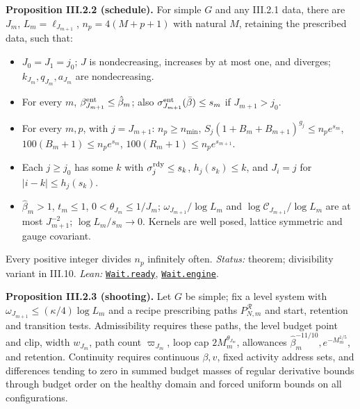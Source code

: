\documentclass[
  letterpaper,
  11pt]{article}
\providecommand{\tightlist}{%
  \setlength{\itemsep}{0pt}\setlength{\parskip}{0pt}}
\begin{document}
\textbf{Proposition III.2.2 (schedule).} For simple \(G\) and any
III.2.1 data, there are \(J_m\), \(L_m=\ell_{J_{m+1}}\),
\(n_p=4(M+p+1)\) with natural \(M\), retaining the prescribed data, such
that:

\begin{itemize}
\tightlist
\item
  \(J_0=J_1=j_0\); \(J\) is nondecreasing, increases by at most one, and
  diverges; \(k_{J_m},q_{J_m},a_{J_m}\) are nondecreasing.
\item
  For every \(m\), \(\beta^{\rm ent}_{J_{m+1}}\le\hat\beta_m\); also
  \(\sigma^{\rm ent}_{J_{m+1}}(\bar\beta)\le s_m\) if \(J_{m+1}>j_0\).
\item
  For every \(m,p\), with \(j=J_{m+1}\): \(n_p\ge n_{\min}\),
  \(S_j(1+B_m+B_{m+1})^{g_j}\le n_pe^{s_m}\),
  \(100(B_m+1)\le n_pe^{s_m}\), \(100(R_m+1)\le n_pe^{s_{m+1}}\).
\item
  Each \(j\ge j_0\) has some \(k\) with \(\sigma^{\rm rdy}_j\le s_k\),
  \(h_j(s_k)\le k\), and \(J_i=j\) for \(|i-k|\le h_j(s_k)\).
\item
  \(\hat\beta_m>1\), \(t_m\le1\), \(0<\theta_{J_m}\le1/J_m\);
  \(\omega_{J_{m+1}}/\log L_m\) and
  \(\log\mathcal C_{J_{m+1}}/\log L_m\) are at most \(J_{m+1}^{-2}\);
  \(\log L_m/s_m\to0\). Kernels are well posed, lattice symmetric and
  gauge covariant.
\end{itemize}

Every positive integer divides \(n_p\) infinitely often. \emph{Status:}
theorem; divisibility variant in III.10. \emph{Lean:}
\href{https://github.com/yang-mills-group/OpenAI-YM-20261028/blob/3456e5e75cf8d4cd558955a5c7638fba2d68f464/YM/Price/Waits.lean\#L137-L239}{\texttt{Wait.ready}},
\href{https://github.com/yang-mills-group/OpenAI-YM-20261028/blob/3456e5e75cf8d4cd558955a5c7638fba2d68f464/YM/PhysicalNext/RG_NEXT_COMPLETE_REPEATABLE_NONLINEAR_STEP/Pane/Divisors.lean\#L26-L135}{\texttt{Wait.engine}}.

\textbf{Proposition III.2.3 (shooting).} Let \(G\) be simple; fix a
level system with \(\omega_{J_{m+1}}\le(\kappa/4)\log L_m\) and a recipe
prescribing paths \(P^{\mathcal R}_{N,m}\) and start, retention and
transition tests. Admissibility requires these paths, the level budget
point and clip, width \(w_{J_m}\), path count \(\varpi_{J_m}\), loop cap
\(2M_m^{\theta_{J_m}}\), allowances
\(\hat\beta_m^{-11/10},e^{-M_m^{1/5}}\), and retention. Continuity
requires continuous \(\beta,v\), fixed activity address sets, and
differences tending to zero in summed budget masses of regular
derivative bounds through budget order on the healthy domain and forced
uniform bounds on all configurations.
\end{document}

